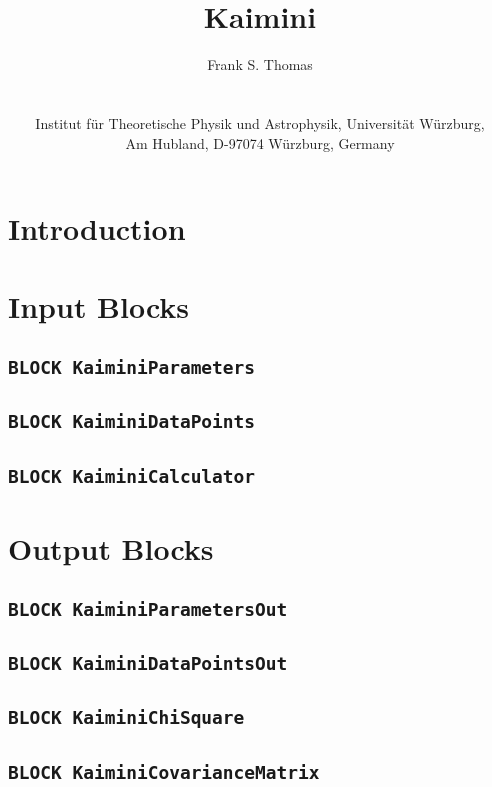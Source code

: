 \documentclass[a4paper,12pt]{article}
\title{\textbf{Kaimini}}
\author{
  Frank S. Thomas\\
  \texttt{\mailto{fthomas@physik.uni-wuerzburg.de}}\\
  \vspace{1em}\\
  Institut für Theoretische Physik und Astrophysik, Universität Würzburg,\\
  Am Hubland, D-97074 Würzburg, Germany
}
\begin{document}
\maketitle

\begin{abstract}
\end{abstract}

\tableofcontents

\section{Introduction}

\section{Input Blocks}

\subsection*{\tt{BLOCK KaiminiParameters}}

\subsection*{\tt{BLOCK KaiminiDataPoints}}

\subsection*{\tt{BLOCK KaiminiCalculator}}

\section{Output Blocks}

\subsection*{\tt{BLOCK KaiminiParametersOut}}

\subsection*{\tt{BLOCK KaiminiDataPointsOut}}

\subsection*{\tt{BLOCK KaiminiChiSquare}}

\subsection*{\tt{BLOCK KaiminiCovarianceMatrix}}
\end{document}

